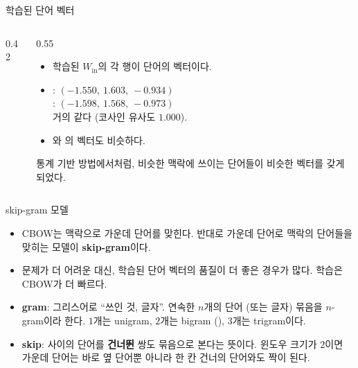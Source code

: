 \documentclass[aspectratio=169,11pt]{beamer}
\begin{document}
\begin{frame}{학습된 단어 벡터}
\begin{columns}[c,onlytextwidth]
\begin{column}{0.42\textwidth}
\end{column}
\begin{column}{0.55\textwidth}
\begin{itemize}
\item 학습된 $W_{\text{in}}$의 각 행이 단어의 벡터이다.
\item {}: $(-1.550,\ 1.603,\ -0.934)$ \\
: $(-1.598,\ 1.568,\ -0.973)$ \\
거의 같다 (코사인 유사도 $1.000$).
\item {}와 의 벡터도 비슷하다.
\end{itemize}
\vskip2mm
\begin{keybox}
통계 기반 방법에서처럼, 비슷한 맥락에 쓰이는 단어들이 비슷한 벡터를 갖게 되었다.
\end{keybox}
\end{column}
\end{columns}
\end{frame}

\begin{frame}{skip-gram 모델}
\begin{itemize}
\item CBOW는 맥락으로 가운데 단어를 맞힌다.
반대로 가운데 단어로 맥락의 단어들을 맞히는 모델이 \textbf{skip-gram}이다.
\item 문제가 더 어려운 대신, 학습된 단어 벡터의 품질이 더 좋은 경우가 많다. 학습은 CBOW가 더 빠르다.
\end{itemize}
\vskip2mm
\begin{remarkbox}[이름의 뜻]
\begin{itemize}
\item \textbf{gram}: 그리스어로 ``쓰인 것, 글자''. 연속한 $n$개의 단어 (또는 글자) 묶음을 $n$-gram이라 한다.
$1$개는 unigram, $2$개는 bigram (), $3$개는 trigram이다.
\item \textbf{skip}: 사이의 단어를 \textbf{건너뛴} 쌍도 묶음으로 본다는 뜻이다.
윈도우 크기가 $2$이면 가운데 단어는 바로 옆 단어뿐 아니라 한 칸 건너의 단어와도 짝이 된다.
\end{itemize}
\end{remarkbox}
\end{frame}
\end{document}
